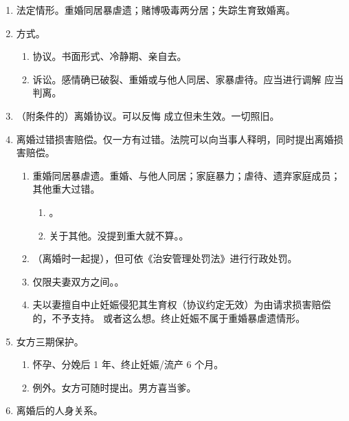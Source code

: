 \begin{enumerate}
\begin{enumerate}
          \item 法定情形。重婚同居暴虐遗；赌博吸毒两分居；失踪生育致婚离。
          \item 方式。
                \begin{enumerate}
                  \item 协议。书面形式、冷静期、亲自去。
                  \item 诉讼。感情确已破裂、重婚或与他人同居、家暴虐待。应当进行调解 \yjt 应当判离。
                \end{enumerate}
          \item （附条件的）离婚协议。可以反悔 \yjt 成立但未生效。一切照旧。
          \item 离婚过错损害赔偿。仅一方有过错。法院可以向当事人释明，同时提出离婚损害赔偿。
                \begin{enumerate}
                  \item 重婚同居暴虐遗。重婚、与他人同居；家庭暴力；虐待、遗弃家庭成员；其他重大过错。
                        \begin{enumerate}
                          \item {}。
                          \item 关于其他。没提到重大就不算。。
                        \end{enumerate}
                  \item {}（离婚时一起提），但可依《治安管理处罚法》进行行政处罚。
                  \item 仅限夫妻双方之间。。
                  \item 夫以妻擅自中止妊娠侵犯其生育权（协议约定无效）为由请求损害赔偿的，不予支持。
                        或者这么想。终止妊娠不属于重婚暴虐遗情形。
                \end{enumerate}
          \item 女方三期保护。
                \begin{enumerate}
                  \item 怀孕、分娩后 1 年、终止妊娠/流产 6 个月。
                  \item 例外。\yi 女方可随时提出。\er 男方喜当爹。
                \end{enumerate}
          \item 离婚后的人身关系。
                \begin{enumerate}

\end{enumerate}
\end{enumerate}
\end{enumerate}

